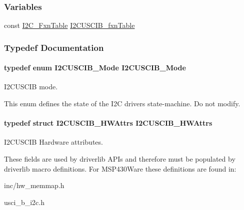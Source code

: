 \subsubsection*{Variables}
\begin{DoxyCompactItemize}
\item 
const \hyperlink{struct_i2_c___fxn_table}{I2\+C\+\_\+\+Fxn\+Table} \hyperlink{_i2_c_u_s_c_i_b_8h_a72eb489c9beee32e652431265a234cbd}{I2\+C\+U\+S\+C\+I\+B\+\_\+fxn\+Table}
\end{DoxyCompactItemize}


\subsubsection{Typedef Documentation}
\paragraph[{I2\+C\+U\+S\+C\+I\+B\+\_\+\+Mode}]{\setlength{\rightskip}{0pt plus 5cm}typedef enum {\bf I2\+C\+U\+S\+C\+I\+B\+\_\+\+Mode}  {\bf I2\+C\+U\+S\+C\+I\+B\+\_\+\+Mode}}\label{_i2_c_u_s_c_i_b_8h_a0aed92306214443ec824ce02e6149251}


I2\+C\+U\+S\+C\+I\+B mode. 

This enum defines the state of the I2\+C driver\textquotesingle{}s state-\/machine. Do not modify. 
\paragraph[{I2\+C\+U\+S\+C\+I\+B\+\_\+\+H\+W\+Attrs}]{\setlength{\rightskip}{0pt plus 5cm}typedef struct {\bf I2\+C\+U\+S\+C\+I\+B\+\_\+\+H\+W\+Attrs}  {\bf I2\+C\+U\+S\+C\+I\+B\+\_\+\+H\+W\+Attrs}}\label{_i2_c_u_s_c_i_b_8h_a83f30e87604a576ba053bea4686c9569}


I2\+C\+U\+S\+C\+I\+B Hardware attributes. 

These fields are used by driverlib A\+P\+Is and therefore must be populated by driverlib macro definitions. For M\+S\+P430\+Ware these definitions are found in\+:
\begin{DoxyItemize}
\item inc/hw\+\_\+memmap.\+h
\item usci\+\_\+b\+\_\+i2c.\+h
\end{DoxyItemize}

